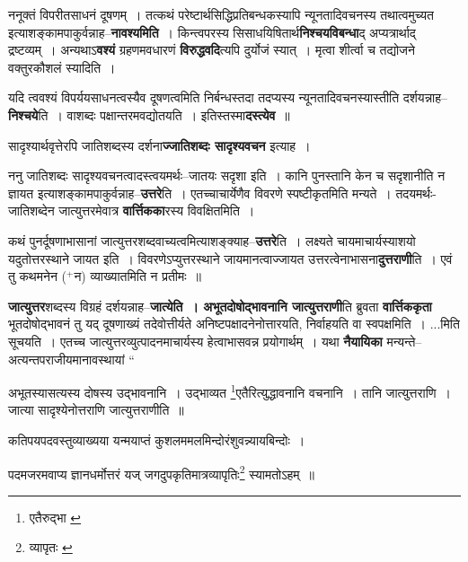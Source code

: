 \documentclass[article,12pt,a4paper]{memoir}
\newcommand{\add}[1]{($^{+}$#1)}
\begin{document}
	  \pstart ननूक्तं विपरीतसाधनं दूषणम् । तत्कथं परेष्टार्थसिद्धिप्रतिबन्धकस्यापि न्यूनतादिवचनस्य तथात्वमुच्यत इत्याशङ्कामपाकुर्वन्नाह--\textbf{नावश्यमिति} । किन्त्वपरस्य सिसाधयिषितार्थ\textbf{निश्चयविबन्धा}द् अप्यत्रार्थाद् द्रष्टव्यम् । अन्यथाऽ\textbf{वश्यं} ग्रहणमवधारणं \textbf{विरुद्धवदि}त्यपि दुर्योजं स्यात् । मृत्वा शीर्त्वा च तद्योजने वक्तुरकौशलं स्यादिति ।
	\pend
      

	  \pstart यदि त्ववश्यं विपर्ययसाधनत्वस्यैव दूषणत्वमिति निर्बन्धस्तदा तदप्यस्य न्यूनतादिवचनस्यास्तीति दर्शयन्नाह--\textbf{निश्चये}ति । वाशब्दः पक्षान्तरमवद्योतयति । इतिस्तस्मा\textbf{दस्त्येव} ॥
	\pend
      

	  \pstart सादृश्यार्थवृत्तेरपि जातिशब्दस्य दर्शना\textbf{ज्जातिशब्दः सादृश्यवचन} इत्याह ।
	\pend
      

	  \pstart ननु जातिशब्दः सादृश्यवचनत्वादस्त्वयमर्थः--जातयः सदृशा इति । कानि पुनस्तानि केन च सदृशानीति न ज्ञायत इत्याशङ्कामपाकुर्वन्नाह--\textbf{उत्तरे}ति । एतच्चाचार्येणैव विवरणे स्पष्टीकृतमिति मन्यते । तदयमर्थः-जातिशब्देन जात्युत्तरमेवात्र \textbf{वार्त्तिकका}रस्य विवक्षितमिति ।
	\pend
      

	  \pstart कथं पुनर्दूषणाभासानां जात्युत्तरशब्दवाच्यत्वमित्याशङ्क्याह--\textbf{उत्तरे}ति । लक्ष्यते चायमाचार्यस्याशयो यदुतोत्तरस्थाने जायत इति । विवरणेऽप्युत्तरस्थाने जायमानत्वाज्जायत उत्तरत्वेनाभासना\textbf{दुत्तराणी}ति । एवं तु कथमनेन \add{न} व्याख्यातमिति न प्रतीमः ॥
	\pend
      

	  \pstart \textbf{जात्युत्तर}शब्दस्य विग्रहं दर्शयन्नाह--\textbf{जात्येति । अभूतदोषोद्भावनानि जात्युत्तराणी}ति ब्रुवता \textbf{वार्त्तिककृता} भूतदोषोद्भावनं तु यद् दूषणाख्यं तदेवोत्तीर्यते अनिष्टपक्षादनेनोत्तारयति, निर्वाहयति वा स्वपक्षमिति । \leavevmode{}...मिति सूचयति । एतच्च जात्युत्तरव्युत्पादनमाचार्यस्य हेत्वाभासवन्न प्रयोगार्थम् । यथा \textbf{नैयायिका} मन्यन्ते--अत्यन्तपराजीयमानावस्थायां     \leavevmode{} “
	  
	अभूतस्यासत्यस्य दोषस्य उद्भावनानि । उद्भाव्यत \footnote{एतैरुद्भा \cite{dp-msC}}एतैरित्युद्धावनानि वचनानि । तानि जात्युत्तराणि । जात्या सादृश्येनोत्तराणि जात्युत्तराणीति ॥ 
	  
	कतिपयपदवस्तुव्याख्यया यन्मयाप्तं कुशलममलमिन्दोरंशुवन्न्यायबिन्दोः । 
	  
	पदमजरमवाप्य ज्ञानधर्मोत्तरं यज् जगदुपकृतिमात्रव्यापृतिः\footnote{व्यापृतः \cite{dp-msC} \cite{dp-msD}} स्यामतोऽहम् ॥ 
	  
\end{document}
